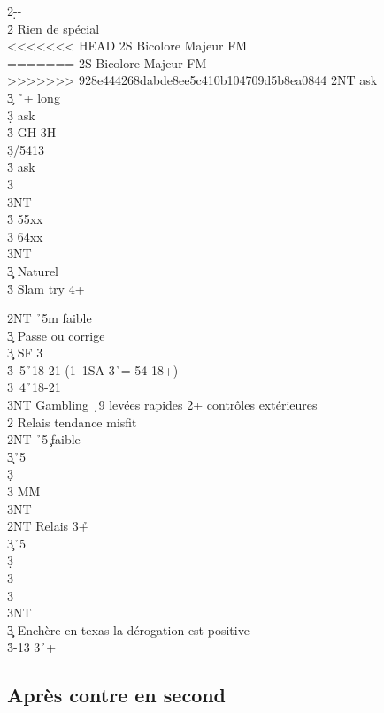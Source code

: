 \documentclass[a4paper]{article}
\begin{document}
\begin{bidtable}
2\d--\+\\
2\h \> Rien de spécial\\
<<<<<<< HEAD
\>2S   Bicolore Majeur  FM  \+\\
=======
\>2S Bicolore Majeur  FM  \+\\
>>>>>>> 928e444268dabde8ee5c410b104709d5b8ea0844
2NT \> ask\+\\
3\c \> \h\ + long\+\\
3\d \> ask\\
3\h \> GH 3H\-\\
3\d {}/5413\+\\
3\h \> ask\+\\
3\s {}\\
3NT \-\-\\
3\h \> 55xx\\
3\s \> 64xx\\
3NT \-\\
3\c\d \> Naturel\\
3\h\s \> Slam try 4+\-\-
\end{bidtable}

\begin{bidtable}
2NT \h\ 5m faible\+\\
3\c\d \> Passe ou corrige\-\\
3\c\d \> SF 3\c \d \\
3\h {}\s\ 5\h\ 18-21 (1\s\ 1SA 3\h\ = 54 18+)\\
3\s {}\s\ 4\h\ 18-21\\
3NT \> Gambling \d\ 9 levées rapides 2+ contrôles extérieures\\
2\s \> Relais tendance misfit\+\\
2NT \h\ 5\c\ faible\\
3\c {}\h\ 5\d \\
3\d {}\h \\
3\s \> MM\\
3NT\-\\
2NT \> Relais 3\h +\+\\
3\c {}\h\ 5\d \\
3\d {}\h \\
3\h\\
3\s\\
3NT\-\\
3\c\d\s \> Enchère en texas la dérogation est positive\\
3\h {}-13 3\h\ +
\end{bidtable}

\subsection{Après contre en second}
\end{document}
